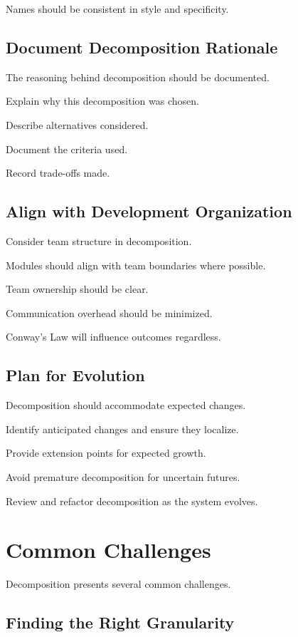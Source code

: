 \documentclass[11pt]{article}
\begin{document}
Names should be consistent in style and specificity.

\subsection{Document Decomposition Rationale}

The reasoning behind decomposition should be documented.

Explain why this decomposition was chosen.

Describe alternatives considered.

Document the criteria used.

Record trade-offs made.

\subsection{Align with Development Organization}

Consider team structure in decomposition.

Modules should align with team boundaries where possible.

Team ownership should be clear.

Communication overhead should be minimized.

Conway's Law will influence outcomes regardless.

\subsection{Plan for Evolution}

Decomposition should accommodate expected changes.

Identify anticipated changes and ensure they localize.

Provide extension points for expected growth.

Avoid premature decomposition for uncertain futures.

Review and refactor decomposition as the system evolves.

\section{Common Challenges}

Decomposition presents several common challenges.

\subsection{Finding the Right Granularity}
\end{document}
